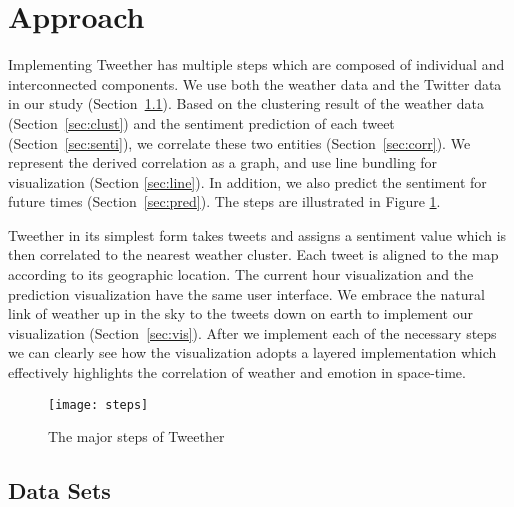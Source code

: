 \section{Approach}

Implementing Tweether has multiple steps which are composed of individual and interconnected components. We use both the weather data and the Twitter data in our study (Section~\ref{sec:dataset}). Based on the clustering result of the weather data (Section~\ref{sec:clust}) and the sentiment prediction of each tweet (Section~\ref{sec:senti}), we correlate these two entities (Section~\ref{sec:corr}). We represent the derived correlation as a graph, and use line bundling for visualization (Section \ref{sec:line}). In addition, we also predict the sentiment for future times (Section~\ref{sec:pred}). The steps are illustrated in Figure \ref{fig:steps}.



Tweether in its simplest form takes tweets and assigns a sentiment value which is then correlated to the nearest weather cluster. Each tweet is aligned to the map according to its geographic location. The current hour visualization and the prediction visualization have the same user interface. We embrace the natural link of weather up in the sky to the tweets down on earth to implement our visualization (Section~\ref{sec:vis}). After we implement each of the necessary steps we can clearly see how the visualization adopts a layered implementation which effectively highlights the correlation of weather and emotion in space-time.
\begin{figure}[htb]
 \centering
 \texttt{[image: steps]}
 \caption{The major steps of Tweether}
 \label{fig:steps}
\end{figure}

\subsection{Data Sets}
\label{sec:dataset}

